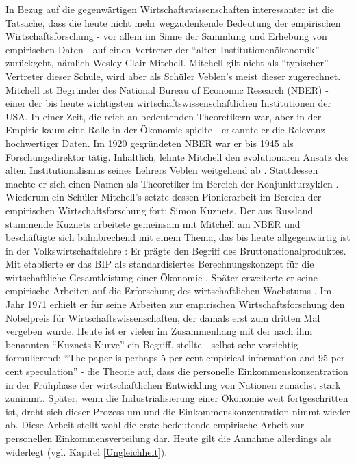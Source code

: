 In Bezug auf die gegenwärtigen Wirtschaftswissenschaften interessanter ist die Tatsache, dass die heute nicht mehr wegzudenkende Bedeutung der empirischen Wirtschaftsforschung - vor allem im Sinne der Sammlung und Erhebung von empirischen Daten - auf einen Vertreter der "`alten Institutionenökonomik"' zurückgeht, nämlich Wesley Clair Mitchell. Mitchell gilt nicht als "`typischer"' Vertreter dieser Schule, wird aber als Schüler Veblen's meist dieser zugerechnet. Mitchell ist Begründer des National Bureau of Economic Research (NBER) - einer der bis heute wichtigsten wirtschaftswissenschaftlichen Institutionen der USA. In einer Zeit, die reich an bedeutenden Theoretikern war, aber in der Empirie kaum eine Rolle in der Ökonomie spielte - erkannte er die Relevanz hochwertiger Daten. Im 1920 gegründeten NBER war er bis 1945 als Forschungsdirektor tätig. Inhaltlich, lehnte Mitchell den evolutionären Ansatz des alten Institutionalismus seines Lehrers Veblen weitgehend ab \parencite[S. 552]{Hodgson2003}. Stattdessen machte er sich einen Namen als Theoretiker im Bereich der Konjunkturzyklen \parencite{Mitchell1913, Mitchell1946}. Wiederum ein Schüler Mitchell's setzte dessen Pionierarbeit im Bereich der empirischen Wirtschaftsforschung fort: Simon Kuznets. Der aus Russland stammende Kuznets arbeitete gemeinsam mit Mitchell am NBER und beschäftigte sich bahnbrechend mit einem Thema, das bis heute allgegenwärtig ist in der Volkswirtschaftslehre \parencite[S. 172]{Hodgson1998}: Er prägte den Begriff des Bruttonationalproduktes. Mit \textcite{Kuznets1937} etablierte er das BIP als standardisiertes Berechnungskonzept für die wirtschaftliche Gesamtleistung einer Ökonomie \parencite{Nobelpreis-Komitee1971}. Später erweiterte er seine empirische Arbeiten auf die Erforschung des wirtschaftlichen Wachstums \parencite{Kuznets1967}. Im Jahr 1971 erhielt er für seine Arbeiten zur empirischen Wirtschaftsforschung den Nobelpreis für Wirtschaftswissenschaften, der damals erst zum dritten Mal vergeben wurde. Heute ist er vielen im Zusammenhang mit der nach ihm benannten "`Kuznets-Kurve"' ein Begriff. \textcite[S. 26]{Kuznets1955} stellte - selbst sehr vorsichtig formulierend: "`The paper is perhaps 5 per cent empirical information and 95 per cent speculation"' - die Theorie auf, dass die personelle Einkommenskonzentration in der Frühphase der wirtschaftlichen Entwicklung von Nationen zunächst stark zunimmt. Später, wenn die Industrialisierung einer Ökonomie weit fortgeschritten ist, dreht sich dieser Prozess um und die Einkommenskonzentration nimmt wieder ab. Diese Arbeit stellt wohl die erste bedeutende empirische Arbeit zur personellen Einkommensverteilung dar. Heute gilt die Annahme allerdings als widerlegt (vgl. Kapitel \ref{Ungleichheit}).

